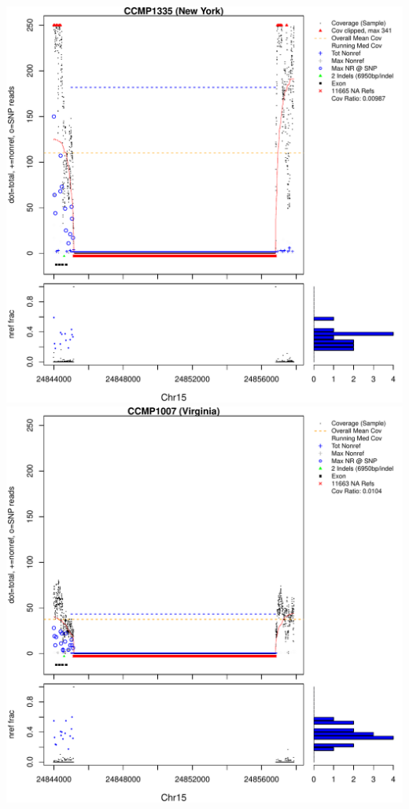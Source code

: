 \documentclass{article}\usepackage[]{graphicx}\usepackage[]{color}
\makeatletter
\def\maxwidth{ %
  \ifdim\Gin@nat@width>\linewidth
    \linewidth
  \else
    \Gin@nat@width
  \fi
}
\newenvironment{knitrout}{}{} %
\makeatother
\begin{document}
\begin{knitrout}
{\centering \includegraphics[width=\maxwidth]{figs-knitr/unnamed-chunk-57-1} 
\includegraphics[width=\maxwidth]{figs-knitr/unnamed-chunk-57-2} 
}
\end{knitrout}
\end{document}
